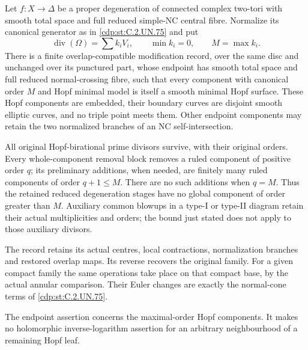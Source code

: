 
\begin{proposition}\label{cdp:st:C.2.UN.77}
Let \(f:X\to\Delta\) be a proper degeneration of connected
complex two-tori with smooth total space and full reduced
simple-NC central fibre.  Normalize its canonical generator
as in \ref{cdp:st:C.2.UN.75} and put
\[
        \operatorname{div}(\Omega)=\sum k_iV_i,\qquad
        \min k_i=0,\qquad M=\max k_i .
\tag{C.HM.1}\label{cdp:eq:C.HM.1}
\]
There is a finite overlap-compatible modification record,
over the same disc and unchanged over its punctured part,
whose endpoint has smooth total space and full reduced
normal-crossing fibre, such that every component with
canonical order \(M\) and Hopf minimal model is itself a
smooth minimal Hopf surface.  These Hopf components are
embedded, their boundary curves are disjoint smooth
elliptic curves, and no triple point meets them.
Other endpoint components may retain the two normalized
branches of an NC self-intersection.

All original Hopf-birational prime divisors survive, with
their original orders.  Every whole-component removal block
removes a ruled component of positive order \(q\);
its preliminary additions, when needed, are finitely many
ruled components of order \(q+1\le M\).  There are no such
additions when \(q=M\).  Thus the retained reduced degeneration stages have
no global component of order greater than \(M\).
Auxiliary common blowups in a type-I or type-II diagram
retain their actual multiplicities and orders; the bound
just stated does not apply to those auxiliary divisors.

The record retains its actual centres, local contractions,
normalization branches and restored overlap maps.  Its
reverse recovers the original family.  For a given compact
family the same operations take place on that compact
base, by the actual annular comparison.  Their Euler
changes are exactly the normal-cone terms of \ref{cdp:st:C.2.UN.75}.

The endpoint assertion concerns the maximal-order Hopf
components.  It makes no holomorphic inverse-logarithm
assertion for an arbitrary neighbourhood of a remaining
Hopf leaf.
\end{proposition}

